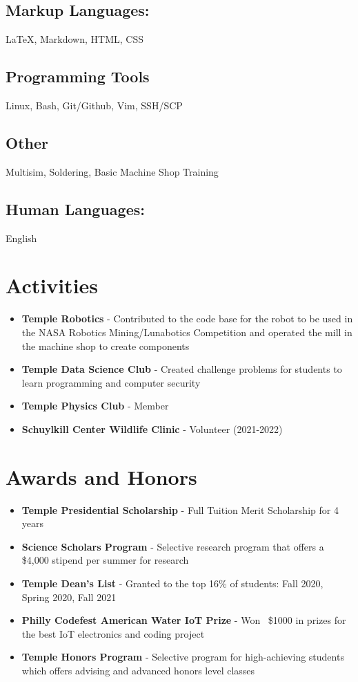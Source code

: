 \documentclass[letterpaper,11pt]{article}
\begin{document}
\subsection{Markup Languages:}
{\LaTeX}, Markdown, HTML, CSS
\subsection{Programming Tools}
Linux, Bash, Git/Github, Vim, SSH/SCP
\subsection{Other} Multisim, Soldering, Basic Machine Shop Training
\subsection{Human Languages:}
English

\section{Activities}
\begin{itemize}
    \item \textbf{Temple Robotics} - Contributed to the code base for the robot to be used in the NASA Robotics Mining/Lunabotics Competition and operated the mill in the machine shop to create components
    \item \textbf{Temple Data Science Club} - Created challenge problems for students to learn programming and computer security
    \item \textbf{Temple Physics Club} - Member
    \item \textbf{Schuylkill Center Wildlife Clinic} - Volunteer (2021-2022)
\end{itemize}


\section{Awards and Honors}
\begin{itemize}
    \item \textbf{Temple Presidential Scholarship} - Full Tuition Merit Scholarship for 4 years
    \item \textbf{Science Scholars Program} - Selective research program that offers a \$4,000 stipend per summer for research
    \item \textbf{Temple Dean's List} - Granted to the top 16\% of students: Fall 2020, Spring 2020, Fall 2021
    \item \textbf{Philly Codefest American Water IoT Prize} - Won ~\$1000 in prizes for the best IoT electronics and coding project
    \item \textbf{Temple Honors Program} - Selective program for high-achieving students which offers advising and advanced honors level classes
\end{itemize}
\end{document}
